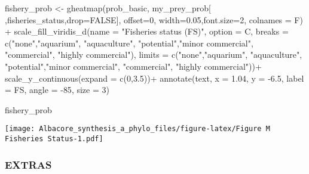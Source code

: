 \documentclass[
]{article}
\newenvironment{Shaded}{\begin{snugshade}}{\end{snugshade}}
\newcommand{\AttributeTok}[1]{\textcolor[rgb]{0.77,0.63,0.00}{#1}}
\newcommand{\ConstantTok}[1]{\textcolor[rgb]{0.00,0.00,0.00}{#1}}
\newcommand{\DecValTok}[1]{\textcolor[rgb]{0.00,0.00,0.81}{#1}}
\newcommand{\FloatTok}[1]{\textcolor[rgb]{0.00,0.00,0.81}{#1}}
\newcommand{\FunctionTok}[1]{\textcolor[rgb]{0.00,0.00,0.00}{#1}}
\newcommand{\NormalTok}[1]{#1}
\newcommand{\OtherTok}[1]{\textcolor[rgb]{0.56,0.35,0.01}{#1}}
\newcommand{\SpecialCharTok}[1]{\textcolor[rgb]{0.00,0.00,0.00}{#1}}
\newcommand{\StringTok}[1]{\textcolor[rgb]{0.31,0.60,0.02}{#1}}
\begin{document}
\begin{Shaded}
\begin{Highlighting}[]
\NormalTok{fishery\_prob }\OtherTok{\textless{}{-}} \FunctionTok{gheatmap}\NormalTok{(prob\_basic, my\_prey\_prob[ ,}\StringTok{\textquotesingle{}fisheries\_status\textquotesingle{}}\NormalTok{,}\AttributeTok{drop=}\ConstantTok{FALSE}\NormalTok{], }
                         \AttributeTok{offset=}\DecValTok{0}\NormalTok{, }\AttributeTok{width=}\FloatTok{0.05}\NormalTok{,}\AttributeTok{font.size=}\DecValTok{2}\NormalTok{, }\AttributeTok{colnames =}\NormalTok{ F) }\SpecialCharTok{+}
  \FunctionTok{scale\_fill\_viridis\_d}\NormalTok{(}\AttributeTok{name =} \StringTok{"Fisheries status (FS)"}\NormalTok{, }
                       \AttributeTok{option =} \StringTok{\textquotesingle{}C\textquotesingle{}}\NormalTok{,}
                       \AttributeTok{breaks =} \FunctionTok{c}\NormalTok{(}\StringTok{"none"}\NormalTok{,}\StringTok{"aquarium"}\NormalTok{, }\StringTok{"aquaculture"}\NormalTok{, }\StringTok{"potential"}\NormalTok{,}\StringTok{"minor commercial"}\NormalTok{,}
                                  \StringTok{"commercial"}\NormalTok{, }\StringTok{"highly commercial"}\NormalTok{),}
                       \AttributeTok{limits =} \FunctionTok{c}\NormalTok{(}\StringTok{"none"}\NormalTok{,}\StringTok{"aquarium"}\NormalTok{, }\StringTok{"aquaculture"}\NormalTok{, }\StringTok{"potential"}\NormalTok{,}\StringTok{"minor commercial"}\NormalTok{,}
                                  \StringTok{"commercial"}\NormalTok{, }\StringTok{"highly commercial"}\NormalTok{))}\SpecialCharTok{+}
  \FunctionTok{scale\_y\_continuous}\NormalTok{(}\AttributeTok{expand =} \FunctionTok{c}\NormalTok{(}\DecValTok{0}\NormalTok{,}\FloatTok{3.5}\NormalTok{))}\SpecialCharTok{+}
  \FunctionTok{annotate}\NormalTok{(}\StringTok{\textquotesingle{}text\textquotesingle{}}\NormalTok{, }\AttributeTok{x =} \FloatTok{1.04}\NormalTok{, }\AttributeTok{y =} \SpecialCharTok{{-}}\FloatTok{6.5}\NormalTok{, }\AttributeTok{label =} \StringTok{\textquotesingle{}FS\textquotesingle{}}\NormalTok{, }\AttributeTok{angle =} \SpecialCharTok{{-}}\DecValTok{85}\NormalTok{, }\AttributeTok{size =} \DecValTok{3}\NormalTok{)}

\NormalTok{fishery\_prob}
\end{Highlighting}
\end{Shaded}

\texttt{[image: Albacore\_synthesis\_a\_phylo\_files/figure-latex/Figure M Fisheries Status-1.pdf]}

\hypertarget{extras}{%
\subsubsection{EXTRAS}\label{extras}}
\end{document}
